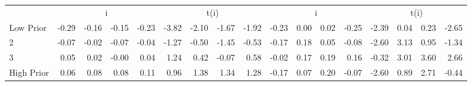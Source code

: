 \begin{table}[!ht]
\begin{tabular}{lrrrrrrrrrrrrrrrr}
  
     & \multicolumn{4}{c}{i} & \multicolumn{4}{c}{t(i)}  & \multicolumn{4}{c}{i} & \multicolumn{4}{c}{t(i)}   \\
     \cmidrule(r){2-5} \cmidrule(r){6-9}  \cmidrule(r){10-13} \cmidrule(r){14-17} 
    Low Prior  & -0.29  & -0.16  & -0.15  & -0.23  & -3.82  & -2.10  & -1.67  & -1.92  & -0.23  & 0.00  & 0.02  & -0.25  & -2.39  & 0.04  & 0.23  & -2.65   \\
    2  & -0.07  & -0.02  & -0.07  & -0.04  & -1.27  & -0.50  & -1.45  & -0.53  & -0.17  & 0.18  & 0.05  & -0.08  & -2.60  & 3.13  & 0.95  & -1.34   \\
    3  & 0.05  & 0.02  & -0.00  & 0.04  & 1.24  & 0.42  & -0.07  & 0.58  & -0.02  & 0.17  & 0.19  & 0.16  & -0.32  & 3.01  & 3.60  & 2.66   \\
    High Prior  & 0.06  & 0.08  & 0.08  & 0.11  & 0.96  & 1.38  & 1.34  & 1.28  & -0.17  & 0.07  & 0.20  & -0.07  & -2.60  & 0.89  & 2.71  & -0.44   \\
    
  
  \bottomrule
\end{tabular}
\label{tbl:32_Size_BMm_Prior_F16}
\end{table}